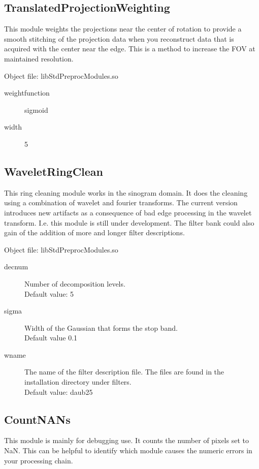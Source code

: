 \documentclass[a4paper]{scrreprt}
\begin{document}
\subsection{TranslatedProjectionWeighting}
This module weights the projections near the center of rotation to provide a smooth stitching of the projection data when you reconstruct data that is acquired with the center near the edge. This is a method to increase the FOV at maintained resolution.

Object file: libStdPreprocModules.so
\begin{description}
 \item[weightfunction] sigmoid
 \item[width] 5
\end{description}

\subsection{WaveletRingClean}
This ring cleaning module works in the sinogram domain. It does the cleaning using a combination of wavelet and fourier transforms\cite{muench2009_stripefilter}. The current version introduces new artifacts as a consequence of bad edge processing in the wavelet transform. I.e. this module is still under development. The filter bank could also gain of the addition of more and longer filter descriptions.

\noindent Object file: libStdPreprocModules.so
\begin{description}
 \item[decnum] Number of decomposition levels. \\Default value: 5
 \item[sigma] Width of the Gaussian that forms the stop band. \\ Default value 0.1
 \item[wname]The name of the filter description file. The files are found in the installation directory under filters. \\Default value: daub25
\end{description}

\subsection{CountNANs}
This module is mainly for debugging use. It counts the number of pixels set
to NaN. This can be helpful to identify which module causes the numeric errors
in your processing chain.
\end{document}
